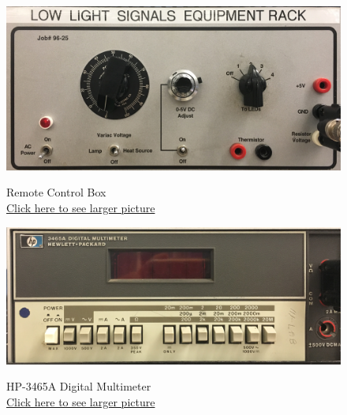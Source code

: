 \documentclass{../lab}
\begin{document}
\begin{figure}[H]
\captionsetup{justification=centering}
  \href{http://experimentationlab.berkeley.edu/sites/default/files/images/LLSimage_LLSEquipmentrack.jpg}{\includegraphics[width=\linewidth,keepaspectratio]{images/LLSimage_LLSEquipmentrack.jpg}}
  \caption{Remote Control Box \\ \href{http://experimentationlab.berkeley.edu/sites/default/files/images/LLSimage_LLSEquipmentrack.jpg}{Click here to see larger picture}}
  \label{fig:RCB.jpg}
\endminipage\hfill
{}
  \href{http://experimentationlab.berkeley.edu/sites/default/files/images/LLSimage_HP-3465A-DMM.jpg}{\includegraphics[width=\linewidth,keepaspectratio]{images/LLSimage_HP-3465A-DMM.jpg}}
  \caption{HP-3465A Digital Multimeter\\
  \href{http://experimentationlab.berkeley.edu/sites/default/files/images/LLSimage_HP-3465A-DMM.jpg}{Click here to see larger picture}}
  \label{fig:LLSimage_HP-3465A-DMM.jpg}
\endminipage
\end{figure}
\end{document}

